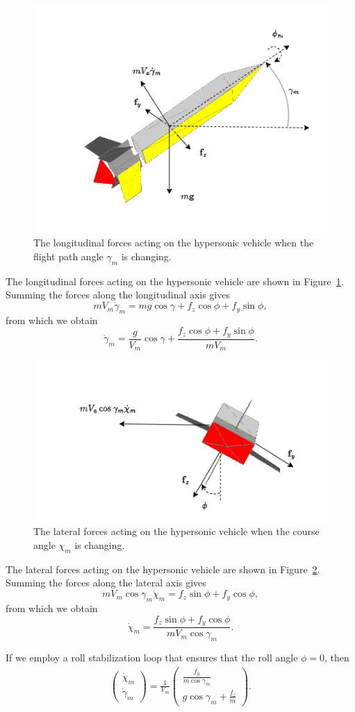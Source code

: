 \documentclass{article}
\begin{document}
	\begin{figure}[hhhh]
  		\includegraphics[width=0.49\linewidth]{./figures/vehicle_forces_longitudinal.png}
  		\caption{The longitudinal forces acting on the hypersonic vehicle when the flight path angle $\gamma_m$ is changing.}
        \label{fig:vehicle_forces_longitudinal}
  	\end{figure} 	
The longitudinal forces acting on the hypersonic vehicle are shown in Figure~\ref{fig:vehicle_forces_longitudinal}.  Summing the forces along the longitudinal axis gives
\[
mV_m \dot{\gamma}_m = mg\cos\gamma + f_z\cos\phi + f_y\sin\phi,
\]
from which we obtain
\[
\dot{\gamma}_m = \frac{g}{V_m}\cos\gamma + \frac{f_z\cos\phi + f_y\sin\phi}{mV_m}.
\]

	\begin{figure}[hhhh]
  		\includegraphics[width=0.49\linewidth]{./figures/vehicle_forces_lateral.png}
  		\caption{The lateral forces acting on the hypersonic vehicle when the course angle $\chi_m$ is changing.}
  	\label{fig:vehicle_forces_lateral}
  	\end{figure} 	
The lateral forces acting on the hypersonic vehicle are shown in Figure~\ref{fig:vehicle_forces_lateral}.  Summing the forces along the lateral axis gives
\[
mV_m \cos\gamma_m \dot{\chi}_m = f_z\sin\phi + f_y\cos\phi,
\]
from which we obtain
\[
\dot{\chi}_m = \frac{f_z\sin\phi + f_y\cos\phi}{mV_m\cos\gamma_m}.
\]

If we employ a roll stabilization loop that ensures that the roll angle $\phi=0$, then 
\begin{align*}
	\begin{pmatrix}	\dot{\chi}_m \\ \dot{\gamma}_m	\end{pmatrix}
	= \frac{1}{V_m}\begin{pmatrix} \frac{f_y}{m\cos\gamma_m} \\ g\cos\gamma_m + \frac{f_z}{m} \end{pmatrix}.
\end{align*}
\end{document}
